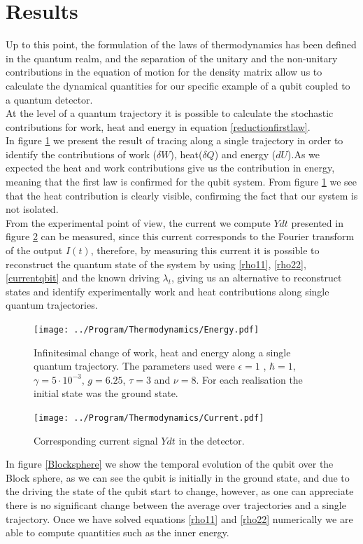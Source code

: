 \section{Results}
Up to this point, the formulation of the laws of thermodynamics has been defined in the quantum realm, and the separation of the unitary and the non-unitary contributions in the equation of motion for the density matrix allow us to calculate the dynamical quantities for our specific example of a qubit coupled to a quantum detector.\\
At the level of a quantum trajectory it is possible to calculate the stochastic contributions for work, heat and energy in equation \eqref{reductionfirstlaw}. \\
In figure \ref{qbitenergy} we present the result of tracing along a single trajectory in order to identify the contributions of  work ($\delta W$), heat($\delta Q$) and energy ($dU$).As we expected the heat and work contributions give us the contribution in energy, meaning that the first law is confirmed for the qubit system. From figure \ref{qbitenergy} we see that the heat contribution is clearly visible, confirming the fact that our system is not isolated.\\
From the experimental point of view, the current we compute $Ydt$ presented in figure \ref{qbitcurrentfig} can be measured, since this current corresponds to the Fourier transform of the output $I(t)$, therefore, by measuring this current it is possible to reconstruct the quantum state of the system by using \eqref{rho11}, \eqref{rho22},\eqref{currentqbit} and the known driving  $\lambda_t$, giving us an alternative to reconstruct states and identify experimentally work and heat contributions along single quantum trajectories. \\
\begin{figure}[h!]
\centering
\texttt{[image: ../Program/Thermodynamics/Energy.pdf]}
\caption{Infinitesimal change of work, heat and energy along a single quantum trajectory. The parameters used were $\epsilon=1$ , $\hbar=1$, $\gamma=5\cdot 10^{-3}$, $g=6.25$, $\tau=3$ and $\nu=8$. For each realisation the initial state was the ground state.}
\label{qbitenergy}
\end{figure}
\begin{figure}[h!]
\centering
\texttt{[image: ../Program/Thermodynamics/Current.pdf]}
\caption{Corresponding current signal $Ydt$ in the detector.}
\label{qbitcurrentfig}
\end{figure}
In figure \ref{Blocksphere} we show the temporal evolution of the qubit over the Block sphere, as we can see the qubit is initially in the ground state, and due to the driving the state of the qubit start to change, however, as one can appreciate there is no significant change between the average over trajectories and a single trajectory. Once we have solved equations \eqref{rho11} and \eqref{rho22} numerically we are able to compute quantities such as the inner energy.\\
